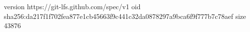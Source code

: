 version https://git-lfs.github.com/spec/v1
oid sha256:da217f1f702fea877e1cb45663f9c441c32da0878297a9bca6f9f777b7c78aef
size 43876
